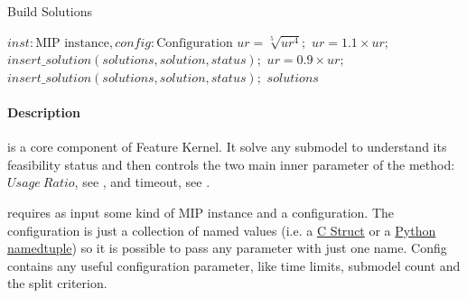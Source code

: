 \begin{algorithm}[H]
    \caption{Build Solutions}\label{algo:build-solutions}
    \begin{algorithmic}[1]
        \REQUIRE $inst: \text{MIP instance}, config: \text{Configuration}$
         
         \label{build-solutions:line:empty-list}
                \STATE $ur = \sqrt[5]{ur^4};$ 
                \STATE $ur = 1.1 \times ur;$ 
                \STATE $insert\_solution(solutions, solution, status);$
                \STATE $ur = 0.9 \times ur;$ 
                \STATE $insert\_solution(solutions, solution, status);$
                \ENDIF
            \ENDIF
        \ENDFOR
        \RETURN $solutions$
    \end{algorithmic}
\end{algorithm}

\paragraph{Description}  is a core component of Feature Kernel. It solve any submodel to understand its feasibility status and then controls 
the two main inner parameter of the method: $Usage\ Ratio$, see , and timeout, see .

 requires as input some kind of MIP instance and a configuration. The configuration is just a collection of named values 
(i.e. a \href{https://en.wikipedia.org/wiki/Struct_(C_programming_language)}{C Struct} or a 
\href{https://docs.python.org/3/library/collections.html#namedtuple-factory-function-for-tuples-with-named-fields}{Python namedtuple}) 
so it is possible to pass any parameter with just one name. Config contains any useful configuration parameter, like time limits, submodel count and the split 
criterion. 

